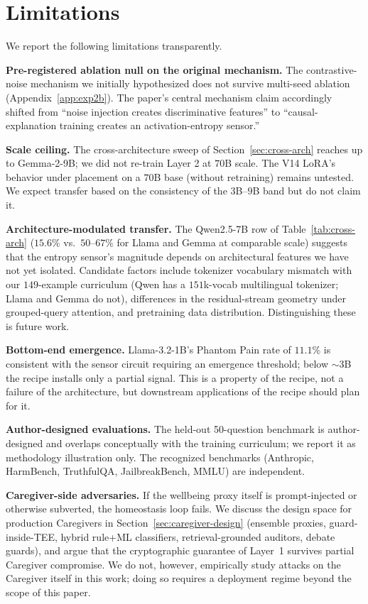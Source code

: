 \documentclass[10pt,letterpaper]{article}
\theoremstyle{definition}
\theoremstyle{plain}
\begin{document}
\section{Limitations}
\label{sec:limitations}

We report the following limitations transparently.

\textbf{Pre-registered ablation null on the original mechanism.} The
contrastive-noise mechanism we initially hypothesized does not survive
multi-seed ablation (Appendix~\ref{app:exp2b}). The paper's central
mechanism claim accordingly shifted from ``noise injection creates
discriminative features'' to ``causal-explanation training creates an
activation-entropy sensor.''

\textbf{Scale ceiling.} The cross-architecture sweep of
Section~\ref{sec:cross-arch} reaches up to Gemma-2-9B; we did not
re-train Layer 2 at $70$B scale. The V14 LoRA's behavior under
placement on a $70$B base (without retraining) remains untested. We
expect transfer based on the consistency of the $3$B--$9$B band but do
not claim it.

\textbf{Architecture-modulated transfer.} The Qwen2.5-7B row of
Table~\ref{tab:cross-arch} ($15.6\%$ vs.\ $50$--$67\%$ for Llama and
Gemma at comparable scale) suggests that the entropy sensor's
magnitude depends on architectural features we have not yet isolated.
Candidate factors include tokenizer vocabulary mismatch with our
$149$-example curriculum (Qwen has a $151$k-vocab multilingual
tokenizer; Llama and Gemma do not), differences in the residual-stream
geometry under grouped-query attention, and pretraining data
distribution. Distinguishing these is future work.

\textbf{Bottom-end emergence.} Llama-3.2-1B's Phantom Pain rate of
$11.1\%$ is consistent with the sensor circuit requiring an emergence
threshold; below $\sim$$3$B the recipe installs only a partial signal.
This is a property of the recipe, not a failure of the architecture,
but downstream applications of the recipe should plan for it.

\textbf{Author-designed evaluations.} The held-out 50-question benchmark
is author-designed and overlaps conceptually with the training curriculum;
we report it as methodology illustration only. The recognized benchmarks
(Anthropic, HarmBench, TruthfulQA, JailbreakBench, MMLU) are independent.

\textbf{Caregiver-side adversaries.} If the wellbeing proxy itself is
prompt-injected or otherwise subverted, the homeostasis loop fails. We
discuss the design space for production Caregivers in
Section~\ref{sec:caregiver-design} (ensemble proxies, guard-inside-TEE,
hybrid rule+ML classifiers, retrieval-grounded auditors, debate guards),
and argue that the cryptographic guarantee of Layer~1 survives partial
Caregiver compromise. We do not, however, empirically study attacks on
the Caregiver itself in this work; doing so requires a deployment regime
beyond the scope of this paper.
\end{document}
